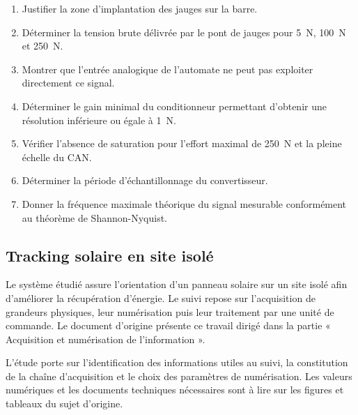 \begin{enumerate}
  \item Justifier la zone d'implantation des jauges sur la barre.
  \item Déterminer la tension brute délivrée par le pont de jauges pour \SI{5}{\newton}, \SI{100}{\newton} et \SI{250}{\newton}.
  \item Montrer que l'entrée analogique de l'automate ne peut pas exploiter directement ce signal.
  \item Déterminer le gain minimal du conditionneur permettant d'obtenir une résolution inférieure ou égale à \SI{1}{\newton}.
  \item Vérifier l'absence de saturation pour l'effort maximal de \SI{250}{\newton} et la pleine échelle du CAN.
  \item Déterminer la période d'échantillonnage du convertisseur.
  \item Donner la fréquence maximale théorique du signal mesurable conformément au théorème de Shannon-Nyquist.
\end{enumerate}

\subsection{Tracking solaire en site isolé}

Le système étudié assure l'orientation d'un panneau solaire sur un site isolé afin d'améliorer la récupération d'énergie. Le suivi repose sur l'acquisition de grandeurs physiques, leur numérisation puis leur traitement par une unité de commande. Le document d'origine présente ce travail dirigé dans la partie « Acquisition et numérisation de l'information ».

L'étude porte sur l'identification des informations utiles au suivi, la constitution de la chaîne d'acquisition et le choix des paramètres de numérisation. Les valeurs numériques et les documents techniques nécessaires sont à lire sur les figures et tableaux du sujet d'origine.

